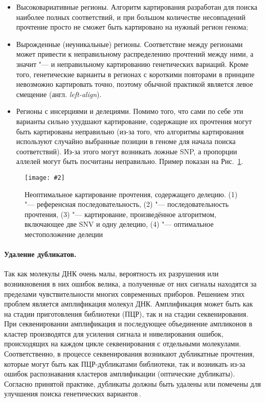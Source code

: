\documentclass[a4paper,14pt]{extarticle}
\newcommand{\centerfigure}[5]
{\begin{figure}[#1]\centering\texttt{[image: \#2]}\caption{\label{#3}#4}\end{figure}}
\newcommand{\ecitep}[1]{\textenglish{\citep{#1}}}
\newcommand{\picref}[1]{Рис.~\ref{#1}}
\newcommand{\engterm}[1]{англ. \textenglish{\textit{#1}}}
\begin{document}
\begin{itemize}
	\item Высоковариативные регионы.
	 Алгоритм картирования разработан для поиска наиболее полных соответствий, и при большом количестве несовпадений прочтение просто не сможет быть картировано на нужный регион генома;
	\item Вырожденные (неуникальные) регионы.
	 Соответствие между регионами может привести к неправильному распределению прочтений между ними, а значит "--- и неправильному картированию генетических вариаций.
	 Кроме того, генетические варианты в регионах с короткими повторами в принципе невозможно картировать точно, поэтому обычной практикой является левое смещение (\engterm{left-align}).
	\item Регионы с инсерциями и делециями.
	 Помимо того, что сами по себе эти варианты сильно ухудшают картирование, содержащие их прочтения могут быть картированы неправильно (из-за того, что алгоритмы картирования используют случайно выбранные позиции в геноме для начала поиска соответствий).
	 Из-за этого могут возникать ложные SNP, а пропорции аллелей могут быть посчитаны неправильно.
	 Пример показан на \picref{fig:indels}.
\end{itemize}

\centerfigure{h}{Indels.pdf}{fig:indels}{Неоптимальное картирование прочтения, содержащего делецию. (1) "--- референсная последовательность, (2) "--- последовательность прочтения, (3) "--- картирование, произведённое алгоритмом, включающее две SNV и одну делецию, (4) "--- оптимальное местоположение делеции}{0.7}

\paragraph{Удаление дубликатов.}
Так как молекулы ДНК очень малы, вероятность их разрушения или возникновения в них ошибок велика, а полученные от них сигналы находятся за пределами чувствительности многих современных приборов.
Решением этих проблем является амплификация молекул ДНК.
Амплификация может быть как на стадии приготовления библиотеки (ПЦР), так и на стадии секвенирования.
При секвенировании амплификация и последующее объединение ампликонов в кластер производятся для усиления сигнала и нивелирования ошибок, происходящих на каждом цикле секвенирования с отдельными молекулами.
Соответственно, в процессе секвенирования возникают дубликатные прочтения, которые могут быть как ПЦР\hyp{}дубликатами библиотеки, так и возникать из-за ошибок распознавания кластеров амплификации (оптические дубликаты).
Согласно принятой практике, дубликаты должны быть удалены или помечены для улучшения поиска генетических вариантов\,\ecitep{Auwera_2013}.
\end{document}
